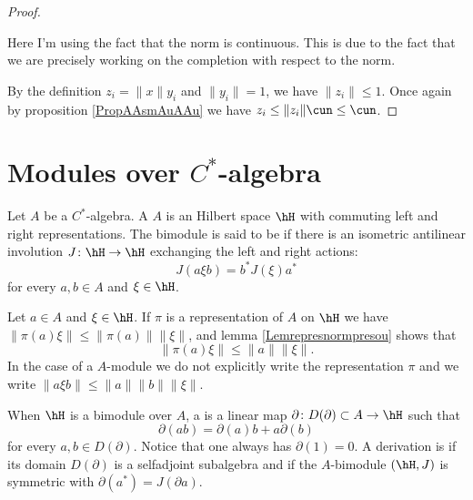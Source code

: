 \begin{proof}
    \begin{probleme}
        Here I'm using the fact that the norm is continuous. This is due to the fact that we are precisely working on the completion with respect to the norm.
    \end{probleme}
    
    By the definition \(z_i=\| x \|y_i\) and \(\| y_i \|=1\), we have \(\| z_i \|\leq 1\). Once again by proposition \ref{PropAAsmAuAAu} we have \(z_i\leq\| z_i \|\cun\leq \cun\).

\end{proof}

\section{Modules over $C^*$-algebra}

\begin{definition}
	Let $A$ be a $C^*$-algebra. A $A$ is an Hilbert space $\hH$ with commuting left and right representations. The bimodule is said to be  if there is an isometric antilinear involution $J\colon \hH\to \hH$ exchanging the left and right actions:
	\begin{equation}
		J(a\xi b)=b^*J(\xi)a^*
	\end{equation}
	for every $a,b\in A$ and $\xi\in\hH$.
\end{definition}

Let \(a\in A\) and \(\xi\in \hH\). If \(\pi\) is a representation of \(A\) on \(\hH\) we have \(\| \pi(a)\xi \|\leq\| \pi(a) \|\| \xi \|\), and lemma \ref{Lemrepresnormpresou} shows that
\begin{equation}        \label{Eqpiaxileqanormxi}
    \| \pi(a)\xi \|\leq \| a \|\| \xi \|.
\end{equation}
In the case of a \(A\)-module we do not explicitly write the representation \(\pi\) and we write \(\| a \xi b\|\leq\| a \|\| b \|\| \xi \|\).

When $\hH$ is a bimodule over $A$, a  is a linear map $\partial\colon D(\partial)\subset A\to \hH$ such that
\begin{equation}
	\partial(ab)=\partial(a)b+a\partial(b)
\end{equation}
for every $a,b\in D(\partial)$. Notice that one always has \(\partial(1)=0\). A derivation is  if its domain $D(\partial)$ is a selfadjoint subalgebra and if the $A$-bimodule $(\hH,J)$ is symmetric with $\partial(a^*)=J(\partial a)$.

